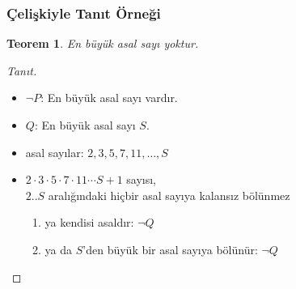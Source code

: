 \documentclass[dvipsnames]{beamer}
\theoremstyle{definition}
\theoremstyle{example}
\theoremstyle{plain}
\newtheorem{teorem}[theorem]{Teorem}
\begin{document}
\begin{frame}
  \frametitle{Çelişkiyle Tanıt Örneği}

  \begin{teorem}
    En büyük asal sayı yoktur.
  \end{teorem}

  \pause
  \begin{proof}[Tanıt]
    \begin{itemize}
      \item $\neg P$: En büyük asal sayı vardır.

      \pause
      \item $Q$: En büyük asal sayı $S$.

      \pause
      \item asal sayılar: $2,3,5,7,11,\dots,S$

      \pause
      \item $2 \cdot 3 \cdot 5 \cdot 7 \cdot 11 \cdots S + 1$ sayısı,\\
        $2..S$ aralığındaki hiçbir asal sayıya kalansız bölünmez

      \pause
      \begin{enumerate}
        \item ya kendisi asaldır: $\neg Q$

        \pause
        \item ya da $S$'den büyük bir asal sayıya bölünür: $\neg Q$
      \end{enumerate}
    \end{itemize}
  \end{proof}
\end{frame}
\end{document}
